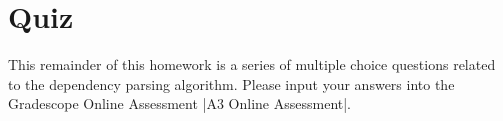 \section{Quiz}

 This remainder of this homework is a series of multiple choice questions related to the dependency parsing algorithm. Please input your answers into the Gradescope Online Assessment |A3 Online Assessment|.
